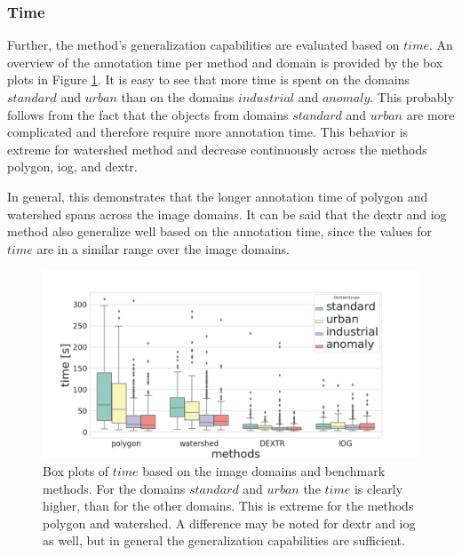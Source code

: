 \subsubsection{Time}
Further, the method's generalization capabilities are evaluated based on $ time $.
An overview of the annotation time per method and domain is provided by the box plots in Figure \ref{fig:ch5:sec2:methods_over_domain_time}.
It is easy to see that more time is spent on the domains $ standard $ and $ urban $ than on the domains $ industrial $ and $ anomaly $.
This probably follows from the fact that the objects from domains $ standard $ and $ urban $ are more complicated and therefore require more annotation time.
This behavior is extreme for watershed method and decrease continuously across the methods polygon, \Gls{iog}, and \gls{dextr}.

In general, this demonstrates that the longer annotation time of polygon and watershed spans across the image domains.
It can be said that the \gls{dextr} and \gls{iog} method also generalize well based on the annotation time, since the values for $ time $ are in a similar range over the image domains.

\begin{figure}[h!]
	\centering
	\includegraphics[width=\textwidth]{figures/chap52_time_methods_over_domains_boxplot.png}
	\caption[Box plots of image domains and methods on  $ time $]{
		Box plots of $ time $ based on the image domains and benchmark methods.
		For the domains $ standard $ and $ urban $ the $ time $ is clearly higher, than for the other domains.
		This is extreme for the methods polygon and watershed.
		A difference may be noted for \gls{dextr} and \gls{iog} as well, but in general the generalization capabilities are sufficient.	
	} \label{fig:ch5:sec2:methods_over_domain_time}
\end{figure}

